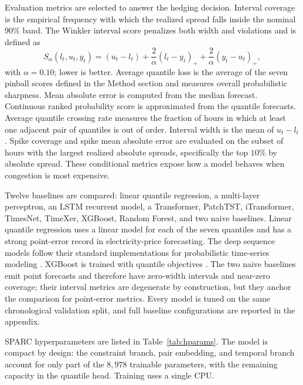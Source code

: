 \documentclass[twoside]{article}
\begin{document}
Evaluation metrics are selected to answer the hedging decision. Interval coverage is the empirical frequency with which the realized spread falls inside the nominal $90\%$ band. The Winkler interval score \citep{matheson1976scoring} penalizes both width and violations and is defined as
\begin{equation}
S_{\alpha}(l_t, u_t, y_t)
= (u_t - l_t)
+ \frac{2}{\alpha} (l_t - y_t)_+
+ \frac{2}{\alpha} (y_t - u_t)_+,
\end{equation}
with $\alpha = 0.10$; lower is better. Average quantile loss is the average of the seven pinball scores defined in the Method section and measures overall probabilistic sharpness. Mean absolute error is computed from the median forecast. Continuous ranked probability score is approximated from the quantile forecasts. Average quantile crossing rate measures the fraction of hours in which at least one adjacent pair of quantiles is out of order. Interval width is the mean of $u_t - l_t$. Spike coverage and spike mean absolute error are evaluated on the subset of hours with the largest realized absolute spreads, specifically the top $10\%$ by absolute spread. These conditional metrics expose how a model behaves when congestion is most expensive.

Twelve baselines are compared: linear quantile regression, a multi-layer perceptron, an LSTM recurrent model, a Transformer, PatchTST, iTransformer, TimesNet, TimeXer, XGBoost, Random Forest, and two naive baselines. Linear quantile regression uses a linear model for each of the seven quantiles and has a strong point-error record in electricity-price forecasting. The deep sequence models follow their standard implementations for probabilistic time-series modeling \citep{wen2017multihorizon, lim2020temporal}. XGBoost is trained with quantile objectives \citep{li2022probabilistic}. The two naive baselines emit point forecasts and therefore have zero-width intervals and near-zero coverage; their interval metrics are degenerate by construction, but they anchor the comparison for point-error metrics. Every model is tuned on the same chronological validation split, and full baseline configurations are reported in the appendix.

SPARC hyperparameters are listed in Table~\ref{tab:hparams}. The model is compact by design: the constraint branch, pair embedding, and temporal branch account for only part of the $8{,}978$ trainable parameters, with the remaining capacity in the quantile head. Training uses a single CPU.
\end{document}
